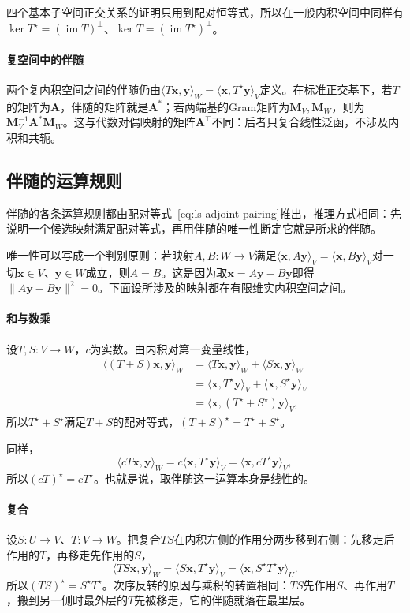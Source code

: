 四个基本子空间正交关系的证明只用到配对恒等式，所以在一般内积空间中同样有$\ker T^\star=(\operatorname{im}T)^\perp$、$\ker T=(\operatorname{im}T^\star)^\perp$。

\paragraph{复空间中的伴随}
两个复内积空间之间的伴随仍由$\langle T\bm x,\bm y\rangle_W=\langle\bm x,T^\star\bm y\rangle_V$定义。在标准正交基下，若$T$的矩阵为$\bm A$，伴随的矩阵就是$\bm A^*$；若两端基的Gram矩阵为$\bm M_V,\bm M_W$，则为$\bm M_V^{-1}\bm A^*\bm M_W$。这与代数对偶映射的矩阵$\bm A^\top$不同：后者只复合线性泛函，不涉及内积和共轭。

\subsection{伴随的运算规则}
\label{sec:ls-adjoint-rules}

伴随的各条运算规则都由配对等式~\eqref{eq:ls-adjoint-pairing}推出，推理方式相同：先说明一个候选映射满足配对等式，再用伴随的唯一性断定它就是所求的伴随。

唯一性可以写成一个判别原则：若映射$A,B:W\to V$满足$\langle\bm x,A\bm y\rangle_V=\langle\bm x,B\bm y\rangle_V$对一切$\bm x\in V$、$\bm y\in W$成立，则$A=B$。这是因为取$\bm x=A\bm y-B\bm y$即得$\lVert A\bm y-B\bm y\rVert^2=0$。下面设所涉及的映射都在有限维实内积空间之间。

\paragraph{和与数乘}
设$T,S:V\to W$，$c$为实数。由内积对第一变量线性，
\[
 \begin{aligned}
 \langle(T+S)\bm x,\bm y\rangle_W
 &=\langle T\bm x,\bm y\rangle_W+\langle S\bm x,\bm y\rangle_W\\
 &=\langle\bm x,T^\star\bm y\rangle_V+\langle\bm x,S^\star\bm y\rangle_V\\
 &=\langle\bm x,(T^\star+S^\star)\bm y\rangle_V,
 \end{aligned}
\]
所以$T^\star+S^\star$满足$T+S$的配对等式，$(T+S)^\star=T^\star+S^\star$。

同样，
\[
 \langle cT\bm x,\bm y\rangle_W=c\langle\bm x,T^\star\bm y\rangle_V=\langle\bm x,cT^\star\bm y\rangle_V,
\]
所以$(cT)^\star=cT^\star$。也就是说，取伴随这一运算本身是线性的。

\paragraph{复合}
设$S:U\to V$、$T:V\to W$。把复合$TS$在内积左侧的作用分两步移到右侧：先移走后作用的$T$，再移走先作用的$S$，
\[
 \langle TS\bm x,\bm y\rangle_W=\langle S\bm x,T^\star\bm y\rangle_V=\langle\bm x,S^\star T^\star\bm y\rangle_U .
\]
所以$(TS)^\star=S^\star T^\star$。次序反转的原因与乘积的转置相同：$TS$先作用$S$、再作用$T$，搬到另一侧时最外层的$T$先被移走，它的伴随就落在最里层。

